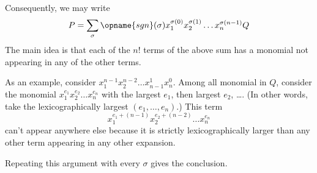 \documentclass[11pt]{scrartcl}
\begin{document}
Consequently, we may write
\[ P = \sum_{\sigma} \opname{sgn}(\sigma)
  x_1^{\sigma(0)} x_2^{\sigma(1)} \dots x_n^{\sigma(n-1)} Q \]
The main idea is that each of the $n!$ terms of the above
sum has a monomial not appearing in any of the other terms.

As an example, consider $x_1^{n-1} x_2^{n-2} \dots x_{n-1}^1 x_n^0$.
Among all monomial in $Q$, consider the monomial
$x_1^{e_1} x_2^{e_2} \dots x_n^{e_n}$
with the largest $e_1$, then largest $e_2$, \dots.
(In other words, take the lexicographically largest
$(e_1, \dots, e_n)$.)
This term
\[ x_1^{e_1 + (n-1)} x_2^{e_2 + (n-2)} \dots x_n^{e_n} \]
can't appear anywhere else because it is strictly lexicographically larger
than any other term appearing in any other expansion.

Repeating this argument with every $\sigma$ gives the conclusion.
\pagebreak
\end{document}
